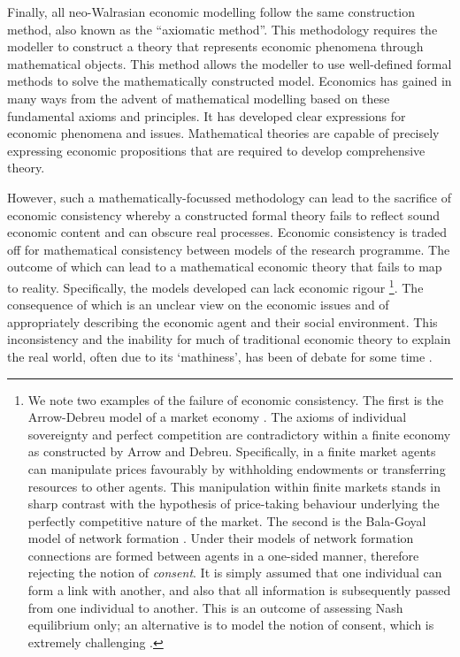 Finally, all neo-Walrasian economic modelling follow the same construction method, also known as the ``axiomatic method''. This methodology requires the modeller to construct a theory that represents economic phenomena through mathematical objects. This method allows the modeller to use well-defined formal methods to solve the mathematically constructed model. Economics has gained in many ways from the advent of mathematical modelling based on these fundamental axioms and principles. It has developed clear expressions for economic phenomena and issues. Mathematical theories are capable of precisely expressing economic propositions that are required to develop comprehensive theory.

However, such a mathematically-focussed methodology can lead to the sacrifice of economic consistency whereby a constructed formal theory fails to reflect sound economic content and can obscure real processes. Economic consistency is traded off for mathematical consistency between models of the research programme. The outcome of which can lead to a mathematical economic theory that fails to map to reality. Specifically, the models developed can lack economic rigour \footnote{We note two examples of the failure of economic consistency. The first is the Arrow-Debreu model of a market economy \citep{ArrowDebreu1954}. The axioms of individual sovereignty and perfect competition are contradictory within a finite economy as constructed by Arrow and Debreu. Specifically, in a finite market agents can manipulate prices favourably by withholding endowments or transferring resources to other agents. This manipulation within finite markets stands in sharp contrast with the hypothesis of price-taking behaviour underlying the perfectly competitive nature of the market. The second is the Bala-Goyal model of network formation \citep{BalaGoyal2000a}. Under their models of network formation connections are formed between agents in a one-sided manner, therefore rejecting the notion of \emph{consent}. It is simply assumed that one individual can form a link with another, and also that all information is subsequently passed from one individual to another. This is an outcome of assessing Nash equilibrium only; an alternative is to model the notion of consent, which is extremely challenging \citep{GillesSarangi-Building, GillesSarangi2010}.}. The consequence of which is an unclear view on the economic issues and of appropriately describing the economic agent and their social environment. This inconsistency and the inability for much of traditional economic theory to explain the real world, often due to its `mathiness', has been of debate for some time \citep{Romer2015}.

